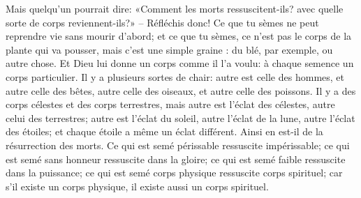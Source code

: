 Mais quelqu’un pourrait dire:
	«Comment les morts ressuscitent-ils?
	avec quelle sorte de corps reviennent-ils?»
– Réfléchis donc! Ce que tu sèmes ne peut reprendre vie sans mourir d’abord;
	et ce que tu sèmes, ce n’est pas le corps de la plante qui va pousser,
	mais c’est une simple graine : du blé, par exemple, ou autre chose.
Et Dieu lui donne un corps comme il l’a voulu:
	à chaque semence un corps particulier.
Il y a plusieurs sortes de chair:
	autre est celle des hommes, et autre celle des bêtes,
	autre celle des oiseaux, et autre celle des poissons.
Il y a des corps célestes et des corps terrestres,
	mais autre est l’éclat des célestes, autre celui des terrestres;
	autre est l’éclat du soleil, autre l’éclat de la lune,
		autre l’éclat des étoiles;
	et chaque étoile a même un éclat différent.
Ainsi en est-il de la résurrection des morts.
Ce qui est semé périssable ressuscite impérissable;
	ce qui est semé sans honneur ressuscite dans la gloire;
	ce qui est semé faible ressuscite dans la puissance;
	ce qui est semé corps physique ressuscite corps spirituel;
	car s’il existe un corps physique, il existe aussi un corps spirituel.
